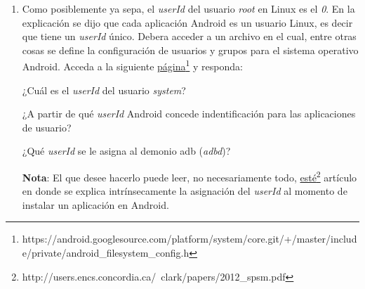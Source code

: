 \begin{itemize}
\begin{enumerate}
	  \item Como posiblemente ya sepa, el \textit{userId} del usuario \textit{root} en Linux es el \emph{0}. En la explicación se dijo que cada aplicación Android es un usuario Linux, es decir que tiene un \textit{userId} único. Debera acceder a un archivo en el cual, entre otras cosas se define la configuración de usuarios y grupos para el sistema operativo Android. Acceda a la siguiente \href{https://android.googlesource.com/platform/system/core.git/+/master/include/private/android\_filesystem\_config.h}{página}\footnote{https://android.googlesource.com/platform/system/core.git/+/master/include/private/android\_filesystem\_config.h} y responda:
	  \begin{questions}
	      \question ¿Cuál es el \textit{userId} del usuario \emph{system}?
	      
	      \question ¿A partir de qué \textit{userId} Android concede indentificación para las aplicaciones de usuario?
	      
	      \question ¿Qué \textit{userId} se le asigna al demonio adb (\textit{adbd})?
	  \end{questions}
	  
	  \textbf{Nota}: El que desee hacerlo puede leer, no necesariamente todo, \href{http://users.encs.concordia.ca/~clark/papers/2012\_spsm.pdf}{esté}\footnote{http://users.encs.concordia.ca/~clark/papers/2012\_spsm.pdf} artículo en donde se explica intrínsecamente la asignación del \textit{userId} al momento de instalar un aplicación en Android.
    \end{enumerate}
\end{itemize}